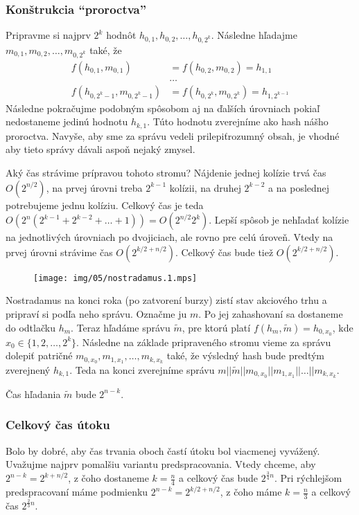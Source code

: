 \subsubsection{Konštrukcia ``proroctva''}

Pripravme si najprv $2^k$ hodnôt $h_{0,1}, h_{0,2}, \dots, h_{0,2^k}$.
Následne hľadajme $m_{0,1}, m_{0,2}, \dots, m_{0,2^k}$ také, že
\begin{align*}
    f(h_{0,1}, m_{0,1}) &= f(h_{0,2}, m_{0,2}) = h_{1,1} \\
  &  \dots \\
    f(h_{0,2^k-1}, m_{0,2^k-1}) &= f(h_{0,2^k}, m_{0,2^k}) = h_{1,
        2^{k-1}} 
\end{align*}
Následne pokračujme podobným spôsobom aj na ďalších úrovniach
pokiaľ nedostaneme jedinú hodnotu $h_{k,1}$.
Túto hodnotu zverejníme ako hash nášho proroctva.
Navyše, aby sme za správu vedeli \clqq prilepiť\crqq rozumný obsah,
je vhodné aby tieto správy dávali aspoň nejaký zmysel.

Aký čas strávime prípravou tohoto stromu?
Nájdenie jednej kolízie trvá čas $O(2^{n/2})$, na prvej úrovni treba 
$2^{k-1}$ kolízii, na druhej $2^{k-2}$ a na poslednej
potrebujeme jednu kolíziu. Celkový čas je teda
$O(2^n (2^{k-1} + 2^{k-2} + \dots + 1)) = O(2^{n/2} 2^k)$.
Lepší spôsob je nehľadať kolízie na jednotlivých úrovniach po dvojiciach,
ale rovno pre celú úroveň.
Vtedy na prvej úrovni strávime čas $O(2^{k/2 + n/2})$. 
Celkový čas bude tiež $O(2^{k/2 + n/2})$.

\begin{figure}[h]
    \centering
    \texttt{[image: img/05/nostradamus.1.mps]}
\end{figure}

Nostradamus na konci roka (po zatvorení burzy) zistí stav akciového
trhu a pripraví si podľa neho správu.
Označme ju $m$. Po jej zahashovaní sa dostaneme do odtlačku
$h_m$. Teraz hľadáme správu $\tilde{m}$, pre ktorú platí
$f(h_m, \tilde{m}) = h_{0,x_0}$, kde $x_0 \in \{1, 2, \dots, 2^k\}$.
Následne na základe pripraveného stromu vieme za správu dolepiť patričné 
$m_{0,x_0}, m_{1,x_1}, \dots, m_{k,x_k}$ také, že
výsledný hash bude predtým zverejnený $h_{k,1}$.
Teda na konci zverejníme správu 
$m || \tilde{m} || m_{0,x_0} || m_{1,x_1} || \dots || m_{k, x_k}$.

Čas hľadania $\tilde{m}$ bude $2^{n-k}$.

\subsubsection{Celkový čas útoku}
Bolo by dobré, aby čas trvania oboch častí útoku bol viacmenej vyvážený. 
Uvažujme najprv pomalšiu variantu predspracovania.
Vtedy chceme, aby $2^{n-k} = 2^{k+n/2}$, z čoho dostaneme
$k=\frac{n}{4}$ a celkový čas bude $2^{\frac{3}{4} n}$.
Pri rýchlejšom predspracovaní máme podmienku $2^{n-k} = 2^{k/2 + n/2}$,
z čoho máme $k = \frac{n}{3}$ a celkový čas $2^{\frac{2}{3}n}$.

